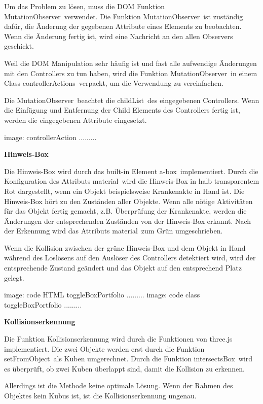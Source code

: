   Um das Problem zu lösen, muss die DOM Funktion \glqq MutationObserver\grqq\ verwendet. Die Funktion \glqq MutationObserver\grqq\ ist zuständig dafür, die Änderung der gegebenen Attribute eines Elements zu beobachten. Wenn die Änderung fertig ist, wird eine Nachricht an den allen Observers geschickt.
  
  Weil die DOM Manipulation sehr häufig ist und fast alle aufwendige Änderungen mit den Controllers zu tun haben, wird die Funktion \glqq MutationObserver\grqq\ in einem Class \glqq controllerActions\grqq\ verpackt, um die Verwendung zu vereinfachen.
  
  Die \glqq MutationObserver\grqq\ beachtet die \glqq childList\grqq\ des eingegebenen Controllers. Wenn die Einfügung und Entfernung der Child Elements des Controllers fertig ist, werden die eingegebenen Attribute eingesetzt. 
  
  image: controllerAction .........
  
  \textbf{Hinweis-Box}
  
  Die Hinweis-Box wird durch das built-in Element \glqq a-box\grqq\ implementiert. Durch die Konfiguration des Attributs \glqq material\grqq\ wird die Hinweis-Box in halb transparentem Rot dargestellt, wenn ein Objekt beispielsweise Krankenakte in Hand ist. Die Hinweis-Box hört zu den Zuständen aller Objekte. Wenn alle nötige Aktivitäten für das Objekt fertig gemacht, z.B. Überprüfung der Krankenakte, werden die Änderungen der entsprechenden Zuständen von der Hinweis-Box erkannt. Nach der Erkennung wird das Attributs \glqq material\grqq\ zum Grün umgeschrieben.
  
  Wenn die Kollision zwischen der grüne Hinweis-Box und dem Objekt in Hand während des Loslösens auf den Auslöser des Controllers detektiert wird, wird der entsprechende Zustand geändert und das Objekt auf den entsprechend Platz gelegt.
  
  image: code HTML toggleBoxPortfolio .........
  image: code class toggleBoxPortfolio .........
  
  \textbf{Kollisionserkennung}
  
  Die Funktion Kollisionserkennung wird durch die Funktionen von three.js implementiert. Die zwei Objekte werden erst durch die Funktion \glqq setFromObject\grqq\ als Kuben umgerechnet. Durch die Funktion \glqq intersectsBox\grqq\ wird es überprüft, ob zwei Kuben überlappt sind, damit die Kollision zu erkennen.
  
  Allerdings ist die Methode keine optimale Lösung. Wenn der Rahmen des Objektes kein Kubus ist, ist die Kollisionserkennung ungenau.
  
